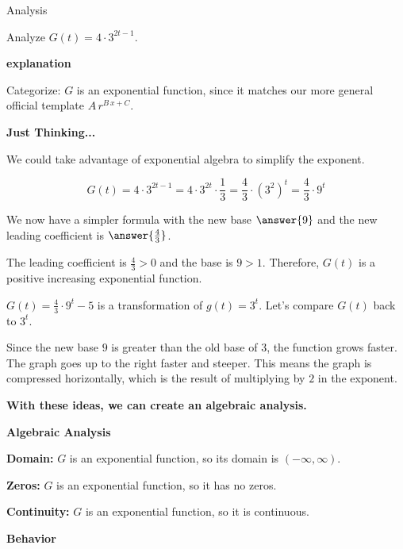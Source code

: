 \documentclass{ximera}
\begin{document}
\begin{example} Analysis



Analyze $G(t) = 4 \cdot 3^{2t-1}$.   


\textbf{\textcolor{red!75!green}{explanation}} 



Categorize:  $G$ is an exponential function, since it matches our more general official template $A \, r^{B \, x + C}$. 


\textbf{Just Thinking...}

We could take advantage of exponential algebra to simplify the exponent.   

\[ 
G(t) = 4 \cdot 3^{2t-1} = 4 \cdot 3^{2t} \cdot \frac{1}{3} = \frac{4}{3} \cdot (3^2)^t  = \frac{4}{3} \cdot 9^t
\]


We now have a simpler formula with the new base $\answer{9}$ and the new leading coefficient is $\answer{\frac{4}{3}}$.




The leading coefficient is $\frac{4}{3} > 0$ and the base is $9 > 1$. Therefore, $G(t)$ is a positive increasing exponential function.



$G(t) = \frac{4}{3} \cdot 9^t - 5$ is a transformation of $g(t) = 3^t$.  Let's compare $G(t)$ back to $3^t$.


Since the new base $9$ is greater than the old base of $3$, the function grows faster.  The graph goes up to the right faster and steeper.  This means the graph is compressed horizontally, which is the result of multiplying by $2$ in the exponent.



\textbf{\textcolor{red!75!green}{With these ideas, we can create an algebraic analysis.}} 


\textbf{\textcolor{purple!65!blue}{Algebraic Analysis}}



\textbf{Domain:}  $G$ is an exponential function, so its domain is $(-\infty, \infty)$.





\textbf{Zeros:}  $G$ is an exponential function, so it has no zeros.




\textbf{Continuity:}  $G$ is an exponential function, so it is continuous.




\textbf{Behavior}



\end{example}
\end{document}
